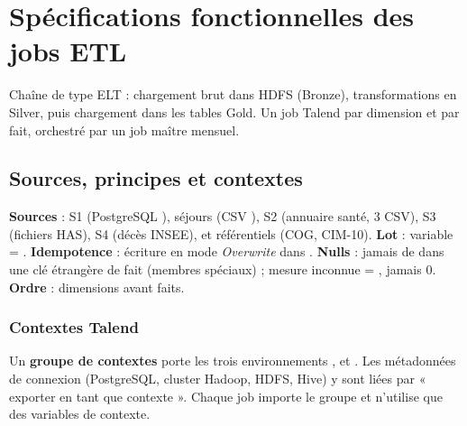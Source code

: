 \chapter{Spécifications fonctionnelles des jobs ETL}\label{chap:etl}

Chaîne de type ELT : chargement brut dans HDFS (Bronze), transformations en Silver, puis chargement dans les tables Gold. Un job Talend par dimension et par fait, orchestré par un job maître mensuel.

\section{Sources, principes et contextes}\label{sec:principes}
\textbf{Sources} : S1 (PostgreSQL ), séjours (CSV ), S2 (annuaire santé, 3 CSV), S3 (fichiers HAS), S4 (décès INSEE), et référentiels (COG, CIM-10). \textbf{Lot} : variable  = . \textbf{Idempotence} : écriture en mode \emph{Overwrite} dans . \textbf{Nulls} : jamais de  dans une clé étrangère de fait (membres spéciaux) ; mesure inconnue = , jamais 0. \textbf{Ordre} : dimensions avant faits.

\subsection{Contextes Talend}\label{sec:contextes}
Un \textbf{groupe de contextes}  porte les trois environnements ,  et . Les métadonnées de connexion (PostgreSQL, cluster Hadoop, HDFS, Hive) y sont liées par « exporter en tant que contexte ». Chaque job importe le groupe et n'utilise que des variables de contexte.

